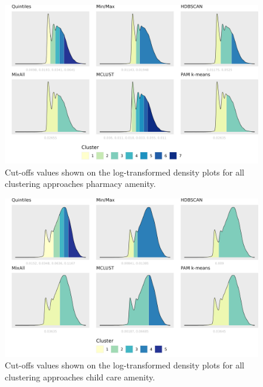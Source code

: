 \documentclass[11pt, a4paper]{article}
\begin{document}
\begin{figure}[H]
\centering
\includegraphics[width=\textwidth]{./cutoffs/by_amenity/Pharmacy_cutoffs.png}
\caption[Pharmacy cutoffs]{Cut-offs values shown on the log-transformed density plots for all clustering approaches pharmacy amenity.}\label{pharmacycutoffs}
\end{figure}










\begin{figure}[H]
\centering
\includegraphics[width=\textwidth]{./cutoffs/by_amenity/Child care_cutoffs.png}
\caption[Child care cutoffs]{Cut-offs values shown on the log-transformed density plots for all clustering approaches child care amenity.}\label{childcarecutoffs}
\end{figure}
\end{document}
